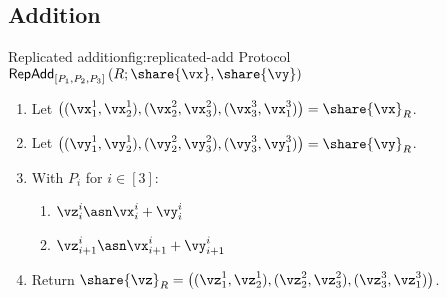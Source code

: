 \subsection{Addition}


\begin{Boxfig}{Replicated addition}{fig:replicated-add}
  {Protocol $\mathsf{RepAdd}_{[P_1, P_2, P_3]}\left(R; \share{\vx}, \share{\vy}\right)$}
  
  \begin{enumerate}
  \item Let $\left( (\vx_1^1, \vx_2^1), (\vx_2^2, \vx_3^2), (\vx_3^3, \vx_1^3) \right) = \share{\vx}_R$.
  \item Let $\left( (\vy_1^1, \vy_2^1), (\vy_2^2, \vy_3^2), (\vy_3^3, \vy_1^3) \right) = \share{\vy}_R$.
  
  \item With $P_i$ for $i \in [3]$:
  \begin{enumerate}
    \item $\vz_i^i \asn \vx_i^i + \vy_i^i$
    \item $\vz_{i+1}^i \asn \vx_{i+1}^i + \vy_{i+1}^i$
  \end{enumerate}
  
  \item Return $\share{\vz}_R = \left( (\vz_1^1, \vz_2^1), (\vz_2^2, \vz_3^2), (\vz_3^3, \vz_1^3) \right)$.
  \end{enumerate}
\end{Boxfig}

